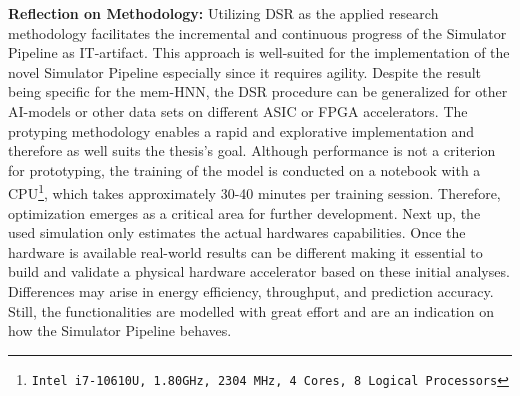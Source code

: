 \textbf{Reflection on Methodology:} 
Utilizing \ac{DSR} as the applied research methodology facilitates the incremental and continuous progress of the Simulator Pipeline as \ac{IT}-artifact.
This approach is well-suited for the implementation of the novel Simulator Pipeline especially since it requires agility.
Despite the result being specific for the \ac{mem-HNN}, the \ac{DSR} procedure can be generalized for other AI-models or other data sets on different \ac{ASIC} or \ac{FPGA} accelerators. 
The protyping methodology enables a rapid and explorative implementation and therefore as well suits the thesis's goal. 
Although performance is not a criterion for prototyping, the training of the model is conducted on a notebook with a CPU\footnote{\texttt{Intel i7-10610U, 1.80GHz, 2304 MHz, 4 Cores, 8 Logical Processors}}, which takes approximately 30-40 minutes per training session.
Therefore, optimization emerges as a critical area for further development.
Next up, the used simulation only estimates the actual hardwares capabilities.
Once the hardware is available real-world results can be different making it essential to build and validate a physical hardware accelerator based on these initial analyses.
Differences may arise in energy efficiency, throughput, and prediction accuracy.
Still, the functionalities are modelled with great effort and are an indication on how the Simulator Pipeline behaves.

